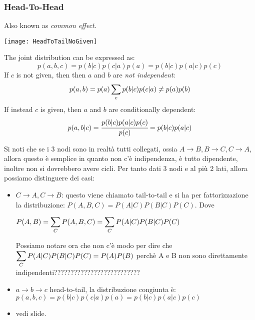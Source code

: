 \subsubsection{Head-To-Head}
Also known as \textit{common effect}.
\begin{center}
	\texttt{[image: HeadToTailNoGiven]}
\end{center}
The joint distribution can be expressed as:
\[
p(a,b,c)=p(b\vert c)p(c\vert a)p(a)=p(b\vert c)p(a\vert c)p(c)
\]
If $c$ is not given, then then $a$ and $b$ are \textit{not independent}:
\[
p(a,b)=p(a)\displaystyle\sum_cp(b\vert c)p(c\vert a)\neq p(a)p(b)
\]
If instead $c$ is given, then $a$ and $b$ are conditionally dependent:
\[
p(a,b\vert c)=\cfrac{p(b\vert c)p(a\vert c)p(c)}{p(c)}=p(b\vert c)p(a\vert c)
\]



 Si noti che se i 3 nodi sono in realtà tutti collegati, ossia $A\rightarrow B, B\rightarrow C, C\rightarrow A$, allora questo è semplice in quanto non c'è indipendenza, è tutto dipendente, inoltre non si dovrebbero avere cicli. Per tanto dati 3 nodi e al più 2 lati, allora possiamo distinguere dei casi:
\begin{itemize}
	\item $C\rightarrow A, C\rightarrow B$: questo viene chiamato tail-to-tail e si ha per fattorizzazione la distribuzione: $P(A, B, C)=P(A\vert C)P(B\vert C)P(C)$. Dove 
		\begin{center}
			$\displaystyle P(A, B)=\displaystyle\sum_CP(A,B,C)=\displaystyle\sum_CP(A\vert C)P(B\vert C)P(C)$
		\end{center} 
		Possiamo notare ora che non c'è modo per dire che $\displaystyle\sum_CP(A\vert C)P(B\vert C)P(C)=P(A)P(B)$ perchè A e B non sono direttamente indipendenti??????????????????????????
	\item $a\rightarrow b\rightarrow c$ head-to-tail, la distribuzione congiunta è: $p(a,b,c)=p(b\vert c)p(c\vert a)p(a)=p(b\vert c)p(a\vert c)p(c)$
	\item vedi slide.
\end{itemize}


